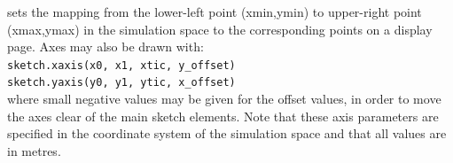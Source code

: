 \noindent
sets the mapping from the lower-left point (xmin,ymin) to 
upper-right point (xmax,ymax) in the simulation space 
to the corresponding points on a display page.
Axes may also be drawn with:\\
\texttt{sketch.xaxis(x0, x1, xtic, y\_offset)} \\
\texttt{sketch.yaxis(y0, y1, ytic, x\_offset)} \\
where small negative values may be given for the offset values, in order to move
the axes clear of the main sketch elements.
Note that these axis parameters are specified in the coordinate system of the simulation space
and that all values are in metres.

